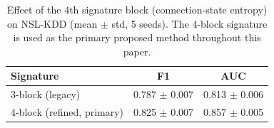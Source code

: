 \begin{table}[t]
\centering
\caption{Effect of the 4th signature block (connection-state entropy) on NSL-KDD (mean $\pm$ std, 5 seeds). The 4-block signature is used as the primary proposed method throughout this paper.}
\label{tab:refinement}
\begin{tabular}{lcc}
\toprule
Signature & F1 & AUC \\
\midrule
3-block (legacy) & 0.787 $\pm$ 0.007 & 0.813 $\pm$ 0.006 \\
4-block (refined, primary) & 0.825 $\pm$ 0.007 & 0.857 $\pm$ 0.005 \\
\bottomrule
\end{tabular}
\end{table}
